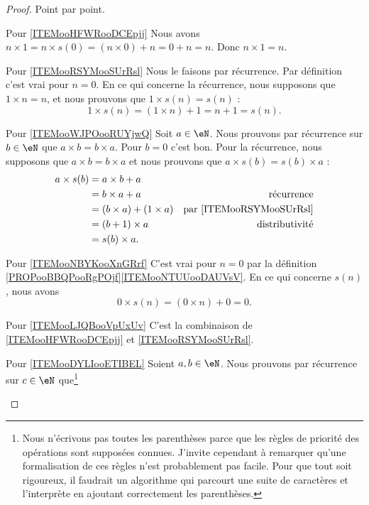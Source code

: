 \begin{proof}
	Point par point.
	\begin{subproof}
		\item[Pour \ref{ITEMooHFWRooDCEpjj}]
		Nous avons \( n\times 1=n\times s(0)=(n\times 0)+n=0+n=n\). Donc \( n\times 1=n\).
		\item[Pour \ref{ITEMooRSYMooSUrRsl}]
		Nous le faisons par récurrence. Par définition c'est vrai pour \( n=0\). En ce qui concerne la récurrence, nous supposons que \( 1\times n=n\), et nous prouvons que \( 1\times s(n)=s(n)\) :
		\begin{equation}
			1\times s(n)=(1\times n)+1=n+1=s(n).
		\end{equation}
		\item[Pour \ref{ITEMooWJPOooRUYjwQ}]
		Soit \( a\in \eN\). Nous prouvons par récurrence sur \( b\in \eN\) que \( a\times b=b\times a\). Pour \( b=0\) c'est bon. Pour la récurrence, nous supposons que \( a\times b=b\times a\) et nous prouvons que \( a\times s(b)=s(b)\times a\) :
		\begin{subequations}
			\begin{align}
				a\times s(b) & =a\times b+a                                                   \\
				             & =b\times a+a             & \text{récurrence}                   \\
				             & =(b\times a)+(1\times a) & \text{par \ref{ITEMooRSYMooSUrRsl}} \\
				             & =(b+1)\times a           & \text{distributivité}               \\
				             & =s(b)\times a.
			\end{align}
		\end{subequations}
		\item[Pour \ref{ITEMooNBYKooXnGRrf}]
		C'est vrai pour \( n=0\) par la définition \ref{PROPooBBQPooRgPOjf}\ref{ITEMooNTUUooDAUVsV}. En ce qui concerne \( s(n)\), nous avons
		\begin{equation}
			0\times s(n)=(0\times n)+0=0.
		\end{equation}
		\item[Pour \ref{ITEMooLJQBooVpUxUv}]
		C'est la combinaison de \ref{ITEMooHFWRooDCEpjj} et \ref{ITEMooRSYMooSUrRsl}.
		\item[Pour \ref{ITEMooDYLIooETIBEL}]
		Soient \( a,b\in \eN\). Nous prouvons par récurrence sur \( c\in \eN\) que\footnote{Nous n'écrivons pas toutes les parenthèses parce que les règles de priorité des opérations sont supposées connues. J'invite cependant  à remarquer qu'une formalisation de ces règles n'est probablement pas facile. Pour que tout soit rigoureux, il faudrait un algorithme qui parcourt une suite de caractères et l'interprète en ajoutant correctement les parenthèses.}

\end{subproof}
\end{proof}
